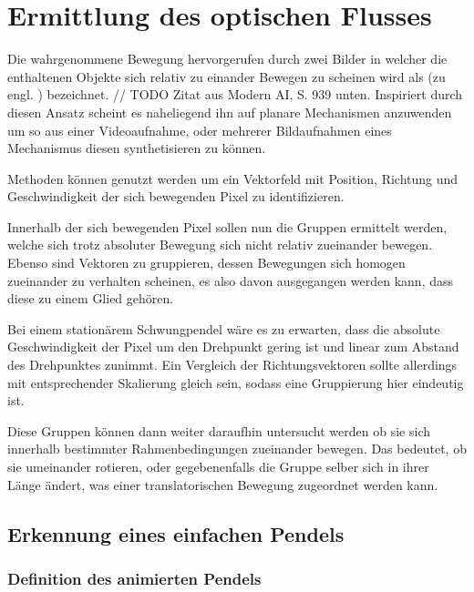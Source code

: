 \chapter{Ermittlung des optischen Flusses}

Die wahrgenommene Bewegung hervorgerufen durch zwei Bilder in welcher die enthaltenen Objekte sich relativ zu einander Bewegen zu scheinen wird als (zu engl. ) bezeichnet. // TODO Zitat aus Modern AI, S. 939 unten.
Inspiriert durch diesen Ansatz scheint es naheliegend ihn auf planare Mechanismen anzuwenden um so aus einer Videoaufnahme, oder mehrerer Bildaufnahmen eines Mechanismus diesen synthetisieren zu können.


 Methoden können genutzt werden um ein Vektorfeld mit Position, Richtung und Geschwindigkeit der sich bewegenden Pixel zu identifizieren.

Innerhalb der sich bewegenden Pixel sollen nun die Gruppen ermittelt werden, welche sich trotz absoluter Bewegung sich nicht relativ zueinander bewegen.
Ebenso sind Vektoren zu gruppieren, dessen Bewegungen sich homogen zueinander zu verhalten scheinen, es also davon ausgegangen werden kann, dass diese zu einem Glied gehören.

Bei einem stationärem Schwungpendel wäre es zu erwarten, dass die absolute Geschwindigkeit der Pixel um den Drehpunkt gering ist und linear zum Abstand des Drehpunktes zunimmt.
Ein Vergleich der Richtungsvektoren sollte allerdings mit entsprechender Skalierung gleich sein, sodass eine Gruppierung hier eindeutig ist.

Diese Gruppen können dann weiter daraufhin untersucht werden ob sie sich innerhalb bestimmter Rahmenbedingungen zueinander bewegen.
Das bedeutet, ob sie umeinander rotieren, oder gegebenenfalls die Gruppe selber sich in ihrer Länge ändert, was einer translatorischen Bewegung zugeordnet werden kann.

\section{Erkennung eines einfachen Pendels}

\subsection{Definition des animierten Pendels}

